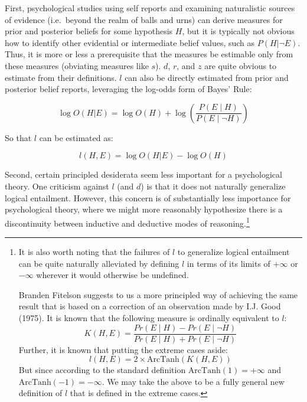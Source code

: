 \documentclass[10pt, letterpaper]{article}
\begin{document}
First, psychological studies using self reports and examining
naturalistic sources of evidence (i.e.~beyond the realm of balls and
urns) can derive measures for prior and posterior beliefs for some
hypothesis \(H\), but it is typically not obvious how to identify other
evidential or intermediate belief values, such as \(P(H|\neg E)\). Thus,
it is more or less a prerequisite that the measures be estimable only
from these measures (obviating measures like \(s\)). \(d\), \(r\), and
\(z\) are quite obvious to estimate from their definitions. \(l\) can
also be directly estimated from prior and posterior belief reports,
leveraging the log-odds form of Bayes' Rule:

\[\log O(H|E) = \log O(H) + \log\left(\frac{P(E \mid H)}{P(E \mid \neg H)}\right)\]

So that \(l\) can be estimated as:

\[l(H,E) = \log O(H|E) - \log O(H)\]

Second, certain principled desiderata seem less important for a
psychological theory. One criticism against \(l\) (and \(d\)) is that it
does not naturally generalize logical entailment. However, this concern
is of substantially less importance for psychological theory, where we
might more reasonably hypothesize there is a discontinuity between
inductive and deductive modes of reasoning.\footnote{It is also worth
  noting that the failures of \(l\) to generalize logical entailment can
  be quite naturally alleviated by defining \(l\) in terms of its limits
  of \(+ \infty\) or \(- \infty\) wherever it would otherwise be
  undefined.

  Branden Fitelson suggests to us a more principled way of achieving the
  same result that is based on a correction of an observation made by
  I.J. Good (1975). It is known that the following measure is ordinally
  equivalent to
  \(l\):\[K(H,E)=\frac{Pr(E \mid H)-Pr(E \mid \neg H)}{Pr(E \mid H)+Pr(E \mid \neg H)}\]
  Further, it is known that putting the extreme cases
  aside:\[l(H,E)=2 \times \text{ArcTanh}\left(K(H,E)\right)\]But since
  according to the standard definition \(\text{ArcTanh}(1)=+\infty\) and
  \(\text{ArcTanh}(-1)=-\infty\). We may take the above to be a fully
  general new definition of \(l\) that is defined in the extreme cases.}
\end{document}

